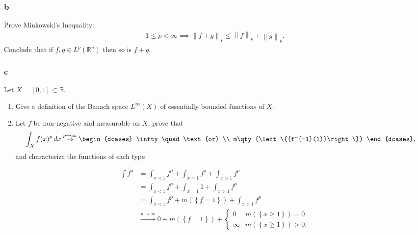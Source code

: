 \hypertarget{b-3}{%
\subsubsection{b}\label{b-3}}

Prove Minkowski's Inequality:
\begin{align*} 1\leq p < \infty \implies {\left\lVert {f+g} \right\rVert}_{p} \leq {\left\lVert {f} \right\rVert}_{p}+ {\left\lVert {g} \right\rVert}_{p} .\end{align*}
Conclude that if \(f, g\in L^p({\mathbb{R}}^n)\) then so is \(f+g\).

\hypertarget{c-2}{%
\subsubsection{c}\label{c-2}}

Let \(X = [0, 1] \subset {\mathbb{R}}\).

\begin{enumerate}
\def\labelenumi{\arabic{enumi}.}
\item
  Give a definition of the Banach space \(L^\infty(X)\) of essentially
  bounded functions of \(X\).
\item
  Let \(f\) be non-negative and measurable on \(X\), prove that
  \begin{align*}     \int_X f(x)^p \,dx \overset{p\to\infty}\to     \begin{dcases}     \infty \quad\text{or} \\     m\qty{\left\{{f^{-1}(1)}\right\}}     \end{dcases}     ,\end{align*}
  and characterize the functions of each type
\end{enumerate}

\begin{solution}

\begin{align*} \int f^p  &= \int_{x < 1} f^p + \int_{x=1}f^p + \int_{x > 1} f^p\\ &= \int_{x < 1} f^p + \int_{x=1}1 + \int_{x > 1} f^p \\ &= \int_{x < 1} f^p + m(\left\{{f = 1}\right\}) + \int_{x > 1} f^p \\ &\overset{p\to\infty}\to 0  + m(\left\{{f = 1}\right\}) +  \begin{cases}  0 & m(\left\{{x\geq 1}\right\}) = 0 \\  \infty & m(\left\{{x\geq 1}\right\}) > 0. \end{cases} \end{align*}

\end{solution}

